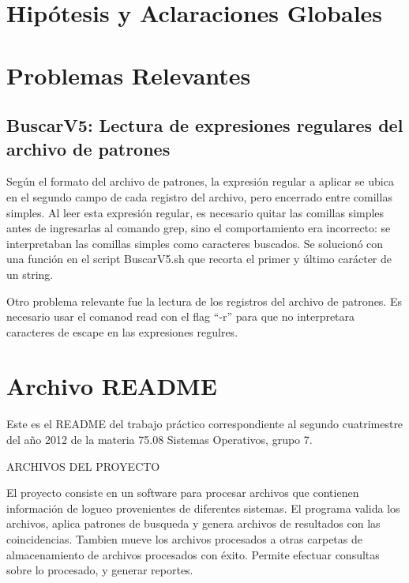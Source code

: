 \documentclass[a4paper,10pt,titlepage]{article}
\begin{document}

\section{Hip\'otesis y Aclaraciones Globales}

\section{Problemas Relevantes}

\subsection{BuscarV5: Lectura de expresiones regulares del archivo de patrones}

Según el formato del archivo de patrones, la expresión regular a aplicar se ubica en el segundo campo de cada registro del archivo, pero encerrado entre comillas simples. Al leer esta expresión regular, es necesario quitar las comillas simples antes de ingresarlas al comando grep, sino el comportamiento era incorrecto: se interpretaban las comillas simples como caracteres buscados. Se solucionó con una función en el script BuscarV5.sh que recorta el primer y último carácter de un string.

Otro problema relevante fue la lectura de los registros del archivo de patrones. Es necesario usar el comanod read con el flag “-r” para que no interpretara caracteres de escape en las expresiones regulres.


\section{Archivo README}


Este es el README del trabajo práctico correspondiente al segundo cuatrimestre del año 2012 de la materia 75.08 Sistemas Operativos, grupo 7.
 
ARCHIVOS DEL PROYECTO
 
El proyecto consiste en un software para procesar archivos que contienen información de logueo provenientes de diferentes sistemas. El programa valida los archivos, aplica patrones de busqueda y genera archivos de resultados con las coincidencias. Tambien mueve los archivos procesados a otras carpetas de almacenamiento de archivos procesados con éxito. Permite efectuar consultas sobre lo procesado, y generar reportes.
\end{document}
